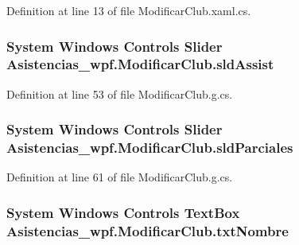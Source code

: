 Definition at line 13 of file Modificar\-Club.\-xaml.\-cs.

\hypertarget{class_asistencias__wpf_1_1_modificar_club_a10b87622ef3fad840bb25827b45b6fc6}{
\subsubsection[{sld\-Assist}]{\setlength{\rightskip}{0pt plus 5cm}System Windows Controls Slider Asistencias\-\_\-wpf.\-Modificar\-Club.\-sld\-Assist\hspace{0.3cm}{\ttfamily [package]}}}\label{class_asistencias__wpf_1_1_modificar_club_a10b87622ef3fad840bb25827b45b6fc6}


Definition at line 53 of file Modificar\-Club.\-g.\-cs.

\hypertarget{class_asistencias__wpf_1_1_modificar_club_a8333d2f10cd950124c2de671a73fd288}{
\subsubsection[{sld\-Parciales}]{\setlength{\rightskip}{0pt plus 5cm}System Windows Controls Slider Asistencias\-\_\-wpf.\-Modificar\-Club.\-sld\-Parciales\hspace{0.3cm}{\ttfamily [package]}}}\label{class_asistencias__wpf_1_1_modificar_club_a8333d2f10cd950124c2de671a73fd288}


Definition at line 61 of file Modificar\-Club.\-g.\-cs.

\hypertarget{class_asistencias__wpf_1_1_modificar_club_aefec4cf6adde6b83050acc590661f212}{
\subsubsection[{txt\-Nombre}]{\setlength{\rightskip}{0pt plus 5cm}System Windows Controls Text\-Box Asistencias\-\_\-wpf.\-Modificar\-Club.\-txt\-Nombre\hspace{0.3cm}{\ttfamily [package]}}}\label{class_asistencias__wpf_1_1_modificar_club_aefec4cf6adde6b83050acc590661f212}


